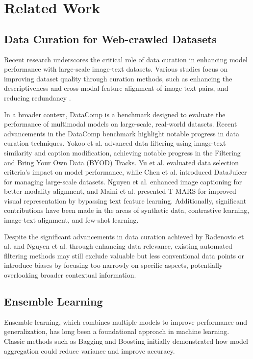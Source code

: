 \section{Related Work}
\label{sec:headings}


\subsection{Data Curation for Web-crawled Datasets}

Recent research underscores the critical role of data curation in enhancing model performance with large-scale image-text datasets. Various studies focus on improving dataset quality through curation methods, such as enhancing the descriptiveness and cross-modal feature alignment of image-text pairs, and reducing redundancy \cite{radenovic2023filtering, nguyen2024improving, abbas2023semdedup}.

In a broader context, DataComp is a benchmark designed to evaluate the performance of multimodal models on large-scale, real-world datasets\cite{gadre2023datacomp}. Recent advancements in the DataComp benchmark highlight notable progress in data curation techniques. Yokoo et al.\cite{yokoo2023leveraging} advanced data filtering using image-text similarity and caption modification, achieving notable progress in the Filtering and Bring Your Own Data (BYOD) Tracks. Yu et al.\cite{yu2023devil} evaluated data selection criteria's impact on model performance, while Chen et al.\cite{chen2024data} introduced DataJuicer for managing large-scale datasets. Nguyen et al.\cite{nguyen2024improving} enhanced image captioning for better modality alignment, and Maini et al.\cite{maini2023t} presented T-MARS for improved visual representation by bypassing text feature learning. Additionally, significant contributions have been made in the areas of synthetic data, contrastive learning, image-text alignment, and few-shot learning\cite{chen2020simple, radford2021learning, jia2021scaling, li2022blip, alayrac2022flamingo}.


Despite the significant advancements in data curation achieved by Radenovic et al.\cite{radenovic2023filtering} and Nguyen et al.\cite{nguyen2024improving} through enhancing data relevance, existing automated filtering methods may still exclude valuable but less conventional data points or introduce biases by focusing too narrowly on specific aspects, potentially overlooking broader contextual information. 

\subsection{Ensemble Learning}
Ensemble learning, which combines multiple models to improve performance and generalization, has long been a foundational approach in machine learning. Classic methods such as Bagging\cite{breiman1996bagging} and Boosting \cite{freund1997decision} initially demonstrated how model aggregation could reduce variance and improve accuracy.

